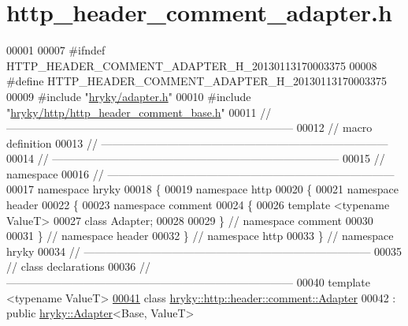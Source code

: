 \hypertarget{http__header__comment__adapter_8h_source}{\section{http\-\_\-header\-\_\-comment\-\_\-adapter.\-h}
}

\begin{DoxyCode}
00001 
00007 \textcolor{preprocessor}{#ifndef HTTP\_HEADER\_COMMENT\_ADAPTER\_H\_20130113170003375}
00008 \textcolor{preprocessor}{}\textcolor{preprocessor}{#define HTTP\_HEADER\_COMMENT\_ADAPTER\_H\_20130113170003375}
00009 \textcolor{preprocessor}{}\textcolor{preprocessor}{#include "\hyperlink{adapter_8h}{hryky/adapter.h}"}
00010 \textcolor{preprocessor}{#include "\hyperlink{http__header__comment__base_8h}{hryky/http/http_header_comment_base.h}"}
00011 \textcolor{comment}{//
      ------------------------------------------------------------------------------}
00012 \textcolor{comment}{// macro definition}
00013 \textcolor{comment}{//
      ------------------------------------------------------------------------------}
00014 \textcolor{comment}{//
      ------------------------------------------------------------------------------}
00015 \textcolor{comment}{// namespace}
00016 \textcolor{comment}{//
      ------------------------------------------------------------------------------}
00017 \textcolor{keyword}{namespace }hryky
00018 \{
00019 \textcolor{keyword}{namespace }http
00020 \{
00021 \textcolor{keyword}{namespace }header
00022 \{
00023 \textcolor{keyword}{namespace }comment
00024 \{
00026     \textcolor{keyword}{template} <\textcolor{keyword}{typename} ValueT>
00027     \textcolor{keyword}{class }Adapter;
00028 
00029 \} \textcolor{comment}{// namespace comment}
00030 
00031 \} \textcolor{comment}{// namespace header}
00032 \} \textcolor{comment}{// namespace http}
00033 \} \textcolor{comment}{// namespace hryky}
00034 \textcolor{comment}{//
      ------------------------------------------------------------------------------}
00035 \textcolor{comment}{// class declarations}
00036 \textcolor{comment}{//
      ------------------------------------------------------------------------------}
00040 \textcolor{comment}{}\textcolor{keyword}{template} <\textcolor{keyword}{typename} ValueT>
\hypertarget{http__header__comment__adapter_8h_source_l00041}{}\hyperlink{classhryky_1_1http_1_1header_1_1comment_1_1_adapter}{00041} \textcolor{keyword}{class }\hyperlink{classhryky_1_1http_1_1header_1_1comment_1_1_adapter}{hryky::http::header::comment::Adapter}
00042     : \textcolor{keyword}{public} \hyperlink{classhryky_1_1_adapter}{hryky::Adapter}<Base, ValueT>

\end{DoxyCode}
